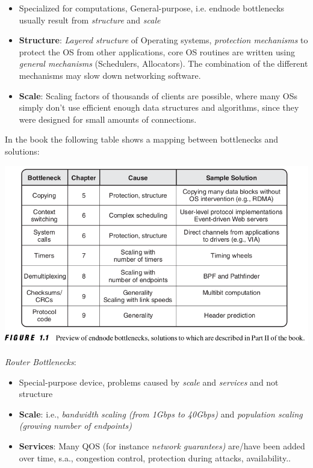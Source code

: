 \begin{itemize}
	\item Specialized for computations, General-purpose, i.e. endnode bottlenecks usually result from \textit{structure} and \textit{scale}
	\item \textbf{Structure}: \textit{Layered structure} of Operating systems, \textit{protection mechanisms} to protect the OS from other applications, core OS routines are written using \textit{general mechanisms} (Schedulers, Allocators). The combination of the different mechanisms may slow down networking software.
	
	\item \textbf{Scale}: Scaling factors of thousands of clients are possible, where many OSs simply don't use efficient enough data structures and algorithms, since they were designed for small amounts of connections.
\end{itemize}

In the book the following table shows a mapping between bottlenecks and solutions:

\includegraphics[width=.8\textwidth]{images/chap1/endnode_bottlenecks}

\textit{Router Bottlenecks}:

\begin{itemize}
	\item Special-purpose device, problems caused by \textit{scale} and \textit{services} and not structure
	
	\item {\textbf{Scale}: i.e., \textit{bandwidth scaling (from 1Gbps to 40Gbps)} and \textit{population scaling (growing number of endpoints)}}
	
	\item {\textbf{Services}: Many QOS (for instance \textit{network guarantees)} are/have been added over time, s.a., congestion control, protection during attacks, availability..}
\end{itemize}

